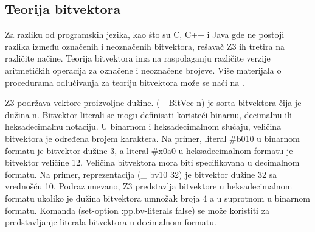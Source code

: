 \documentclass[12pt,oneside]{memoir}
\begin{document}
\subsection{Teorija bitvektora} 
Za razliku od programskih jezika, kao što su C, C++ i Java gde ne postoji razlika između označenih i neoznačenih bitvektora, rešavač Z3 ih tretira na različite načine. Teorija bitvektora ima na raspolaganju različite verzije aritmetičkih operacija za označene i neoznačene brojeve. Više materijala o procedurama odlučivanja za teoriju bitvektora može se naći na \cite{DPBitvector}.
\par
Z3 podržava vektore proizvoljne dužine. (\_ BitVec n) je sorta bitvektora čija je dužina n. Bitvektor literali se mogu definisati koristeći binarnu, decimalnu ili heksadecimalnu notaciju. U binarnom i heksadecimalnom slučaju, veličina bitvektora je određena brojem karaktera. Na primer, literal \#b010 u binarnom formatu je bitvektor dužine 3, a literal \#x0a0 u heksadecimalnom formatu je bitvektor veličine 12. Veličina bitvektora mora biti specifikovana u decimalnom formatu. Na primer, reprezentacija (\_ bv10 32) je bitvektor dužine 32 sa vrednošću 10. Podrazumevano, Z3 predstavlja bitvektore u heksadecimalnom formatu ukoliko je dužina bitvektora umnožak broja 4 a u suprotnom u binarnom formatu. Komanda 
(set-option :pp.bv-literals false) se može koristiti za predstavljanje literala bitvektora u decimalnom formatu. 
\end{document}
